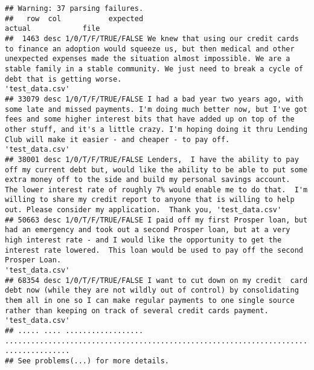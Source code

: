 \documentclass[
]{article}
\begin{document}
\begin{verbatim}
## Warning: 37 parsing failures.
##   row  col           expected                                                                                                                                                                                                                                                                                                                                                                     actual            file
##  1463 desc 1/0/T/F/TRUE/FALSE We knew that using our credit cards to finance an adoption would squeeze us, but then medical and other unexpected expenses made the situation almost impossible. We are a stable family in a stable community. We just need to break a cycle of debt that is getting worse.                                                                                               'test_data.csv'
## 33079 desc 1/0/T/F/TRUE/FALSE I had a bad year two years ago, with some late and missed payments. I'm doing much better now, but I've got fees and some higher interest bits that have added up on top of the other stuff, and it's a little crazy. I'm hoping doing it thru Lending Club will make it easier - and cheaper - to pay off.                                                                'test_data.csv'
## 38001 desc 1/0/T/F/TRUE/FALSE Lenders,  I have the ability to pay off my current debt but, would like the ability to be able to put some extra money off to the side and build my personal savings account.  The lower interest rate of roughly 7% would enable me to do that.  I'm willing to share my credit report to anyone that is willing to help out. Please consider my application.  Thank you, 'test_data.csv'
## 50663 desc 1/0/T/F/TRUE/FALSE I paid off my first Prosper loan, but had an emergency and took out a second Prosper loan, but at a very high interest rate - and I would like the opportunity to get the interest rate lowered.  This loan would be used to pay off the second Prosper Loan.                                                                                                              'test_data.csv'
## 68354 desc 1/0/T/F/TRUE/FALSE I want to cut down on my credit  card debt now (while they are not wildly out of control) by consolidating them all in one so I can make regular payments to one single source rather than keeping on track of several credit cards payment.                                                                                                                               'test_data.csv'
## ..... .... .................. .......................................................................................................................................................................................................................................................................................................................................................................... ...............
## See problems(...) for more details.
\end{verbatim}
\end{document}
